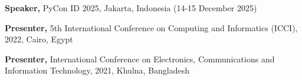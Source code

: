 
\begin{cvlistsection}
\item \textbf{Speaker,} PyCon ID 2025, Jakarta, Indonesia (14-15 December 2025)
\item \textbf{Presenter,} 5th International Conference on Computing and Informatics (ICCI), 2022, Cairo, Egypt
\item \textbf{Presenter,} International Conference on Electronics, Communications and Information Technology, 2021, Khulna, Bangladesh




\end{cvlistsection}
